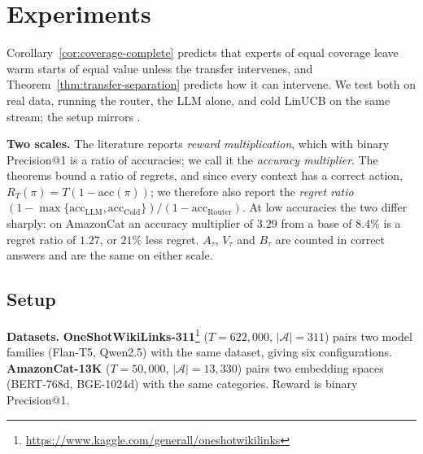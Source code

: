 \documentclass{article}
\theoremstyle{definition}
\theoremstyle{remark}
\theoremstyle{remark}
\begin{document}
\section{Experiments}
\label{sec:experiments}

Corollary~\ref{cor:coverage-complete} predicts that experts of equal coverage
leave warm starts of equal value unless the transfer intervenes, and
Theorem~\ref{thm:transfer-separation} predicts how it can intervene. We test
both on real data, running the router, the LLM alone, and cold LinUCB on the
same stream; the setup mirrors \cite{chen2024llmdecision}.

\textbf{Two scales.} The literature reports \emph{reward multiplication},
which with binary Precision@1 is a ratio of accuracies; we call it the
\emph{accuracy multiplier}. The theorems bound a ratio of regrets, and since
every context has a correct action, $R_T(\pi)=T(1-\mathrm{acc}(\pi))$; we
therefore also report the \emph{regret ratio}
$(1-\max\{\mathrm{acc}_{\mathrm{LLM}},\mathrm{acc}_{\mathrm{Cold}}\})/(1-\mathrm{acc}_{\mathrm{Router}})$.
At low accuracies the two differ sharply: on AmazonCat an accuracy multiplier
of $3.29$ from a base of $8.4\%$ is a regret ratio of $1.27$, or $21\%$ less
regret. $A_\tau$, $V_\tau$ and $B_\tau$ are counted in correct answers and are
the same on either scale.

\subsection{Setup}
\label{sec:exp-setup}

\textbf{Datasets.} \textbf{OneShotWikiLinks-311}\footnote{\url{https://www.kaggle.com/generall/oneshotwikilinks}} ($T\!=\!622{,}000$,
$|\mathcal A|\!=\!311$) pairs two model families (Flan-T5, Qwen2.5) with the
same dataset, giving six configurations. \textbf{AmazonCat-13K}
\cite{bhatia2016extreme} ($T\!=\!50{,}000$, $|\mathcal A|\!=\!13{,}330$) pairs two embedding spaces
(BERT-768d, BGE-1024d) with the same categories. Reward is binary
Precision@1.
\end{document}
